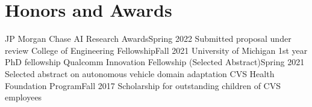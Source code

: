 \section{Honors and Awards}
  \CVSubHeadingListStart
    \CVSubheading
      {JP Morgan Chase AI Research Awards}{Spring 2022}
      {Submitted proposal under review}{}
    \CVSubheading
      {College of Engineering Fellowship}{Fall 2021}
      {University of Michigan 1st year PhD fellowship}{}
    \CVSubheading
      {Qualcomm Innovation Fellowship (Selected Abstract)}{Spring 2021}
      {Selected abstract on autonomous vehicle domain adaptation}{}
    \CVSubheading
      {CVS Health Foundation Program}{Fall 2017}
      {Scholarship for outstanding children of CVS employees}{}
  \CVSubHeadingListEnd
